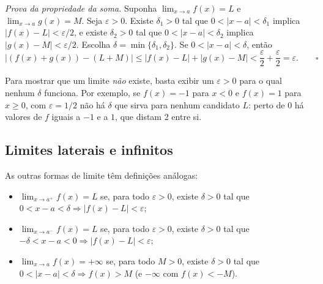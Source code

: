 \emph{Prova da propriedade da soma.} Suponha $\lim_{x\to a}f(x)=L$ e
$\lim_{x\to a}g(x)=M$. Seja $\varepsilon>0$. Existe $\delta_1>0$ tal que
$0<|x-a|<\delta_1$ implica $|f(x)-L|<\varepsilon/2$, e existe $\delta_2>0$ tal que
$0<|x-a|<\delta_2$ implica $|g(x)-M|<\varepsilon/2$. Escolha $\delta=\min\{\delta_1,\delta_2\}$.
Se $0<|x-a|<\delta$, então
\[
|(f(x)+g(x))-(L+M)|\le|f(x)-L|+|g(x)-M|<\frac\varepsilon2+\frac\varepsilon2=\varepsilon. \qquad\square
\]

Para mostrar que um limite \emph{não} existe, basta exibir um $\varepsilon>0$ para o qual
nenhum $\delta$ funciona. Por exemplo, se $f(x)=-1$ para $x<0$ e $f(x)=1$ para $x\ge0$, com
$\varepsilon=1/2$ não há $\delta$ que sirva para nenhum candidato $L$: perto de 0 há valores
de $f$ iguais a $-1$ e a $1$, que distam 2 entre si.

\subsection{Limites laterais e infinitos}

As outras formas de limite têm definições análogas:
\begin{itemize}
\item $\lim_{x\to a^+}f(x)=L$ se, para todo $\varepsilon>0$, existe $\delta>0$ tal que
  $0<x-a<\delta\Rightarrow|f(x)-L|<\varepsilon$;
\item $\lim_{x\to a^-}f(x)=L$ se, para todo $\varepsilon>0$, existe $\delta>0$ tal que
  $-\delta<x-a<0\Rightarrow|f(x)-L|<\varepsilon$;
\item $\lim_{x\to a}f(x)=+\infty$ se, para todo $M>0$, existe $\delta>0$ tal que
  $0<|x-a|<\delta\Rightarrow f(x)>M$ (e $-\infty$ com $f(x)<-M$).
\end{itemize}

